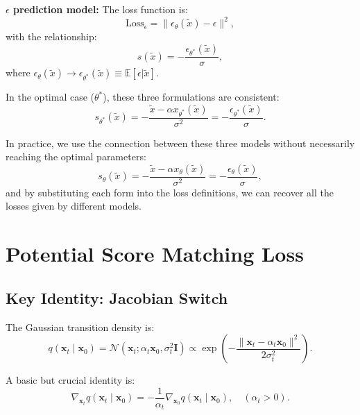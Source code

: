 \textbf{$\epsilon$ prediction model:} The loss function is:
\begin{equation}
\text{Loss}_{\epsilon} = \|\epsilon_\theta(\tilde{x}) - \epsilon\|^2,
\end{equation}
with the relationship:
\begin{equation}
s(\tilde{x}) = -\frac{\epsilon_{\theta^*}(\tilde{x})}{\sigma},
\end{equation}
where $\epsilon_\theta(\tilde{x}) \to \epsilon_{\theta^*}(\tilde{x}) \equiv \mathbb{E}[\epsilon|\tilde{x}]$.

In the optimal case ($\theta^*$), these three formulations are consistent:
\begin{equation}
s_{\theta^{*}}(\tilde{x}) = -\frac{\tilde{x}-\alpha x_{\theta^*} (\tilde{x})}{\sigma^2} = -\frac{\epsilon_{\theta^*}(\tilde{x})}{\sigma}.
\end{equation}

In practice, we use the connection between these three models without necessarily reaching the optimal parameters:
\begin{equation}
s_\theta(\tilde{x}) = -\frac{\tilde{x}-\alpha x_{\theta} (\tilde{x})}{\sigma^2} = -\frac{\epsilon_{\theta}(\tilde{x})}{\sigma},
\end{equation}
and by substituting each form into the loss definitions, we can recover all the losses given by different models.

\section{Potential Score Matching Loss}

\subsection{Key Identity: Jacobian Switch}

The Gaussian transition density is:
\begin{equation}
q(\mathbf{x}_t \mid \mathbf{x}_0) = \mathcal{N}(\mathbf{x}_t; \alpha_t \mathbf{x}_0, \sigma_t^2\mathbf{I}) \propto \exp\left(-\frac{\|\mathbf{x}_t-\alpha_t \mathbf{x}_0\|^2}{2\sigma_t^2}\right).
\end{equation}

A basic but crucial identity is:
\begin{equation}
\nabla_{\mathbf{x}_t} q(\mathbf{x}_t \mid \mathbf{x}_0) = -\frac{1}{\alpha_t} \nabla_{\mathbf{x}_0} q(\mathbf{x}_t \mid \mathbf{x}_0), \quad (\alpha_t > 0).
\end{equation}

